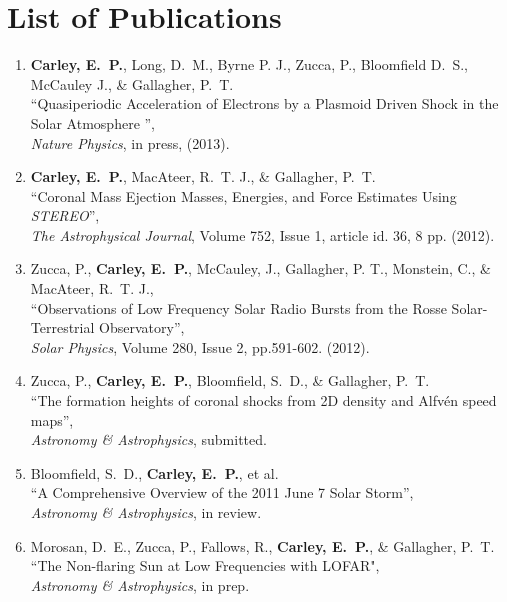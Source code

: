 \chapter{List of Publications}
\label{chapter:publications}


\begin{enumerate}

\item \textbf{Carley, E.~P.}, Long, D.~M., Byrne P. J., Zucca, P., Bloomfield D.~S., McCauley J., \& Gallagher, P.~T.\\
``Quasiperiodic Acceleration of Electrons by a Plasmoid Driven Shock in the Solar Atmosphere '', \\
\emph{Nature Physics}, in press, (2013).

\item \textbf{Carley, E.~P.}, MacAteer, R.~T. J., \& Gallagher, P.~T.\\
``Coronal Mass Ejection Masses, Energies, and Force Estimates Using \emph{STEREO}'', \\
\emph{The Astrophysical Journal}, Volume 752, Issue 1, article id. 36, 8 pp. (2012).

\item Zucca, P., \textbf{Carley, E.~P.},  McCauley, J., Gallagher, P. T., Monstein, C., \& MacAteer, R.~T. J.,\\
``Observations of Low Frequency Solar Radio Bursts from the Rosse Solar-Terrestrial Observatory'', \\
\emph{Solar Physics}, Volume 280, Issue 2, pp.591-602. (2012).

\item Zucca, P., \textbf{Carley, E.~P.}, Bloomfield, S.~D., \& Gallagher, P.~T.\\
``The formation heights of coronal shocks from 2D density and Alfv\'{e}n speed maps'', \\
\emph{Astronomy \& Astrophysics}, submitted.

\item Bloomfield, S.~D., \textbf{Carley, E.~P.}, et al.\\
``A Comprehensive Overview of the 2011 June 7 Solar Storm'', \\
\emph{Astronomy \& Astrophysics}, in review.

\item Morosan, D.~E., Zucca, P., Fallows, R., \textbf{Carley, E.~P.}, \& Gallagher, P.~T.
``The Non-flaring Sun at Low Frequencies with LOFAR", \\
\emph{Astronomy \& Astrophysics}, in prep.


\end{enumerate}
